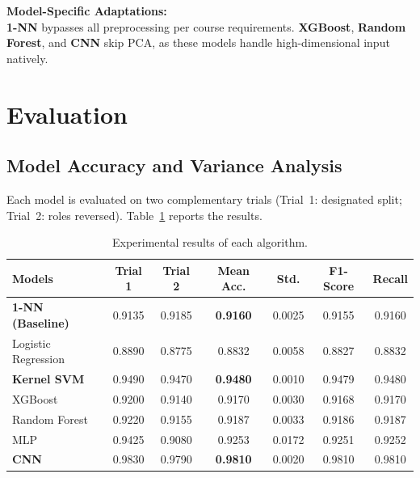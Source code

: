 \documentclass[11pt,a4paper]{article}
\begin{document}
\noindent \textbf{Model-Specific Adaptations:} \\
\textbf{1-NN} bypasses all preprocessing per course requirements. \textbf{XGBoost}, \textbf{Random Forest}, and \textbf{CNN} skip PCA, as these models handle high-dimensional input natively.

\section{Evaluation}

\subsection{Model Accuracy and Variance Analysis}
Each model is evaluated on two complementary trials (Trial~1: designated split; Trial~2: roles reversed). Table~\ref{tab:final_results} reports the results.

\begin{table}[H]
    \centering
    \renewcommand{\arraystretch}{1.3} %
    \small
    \begin{tabular}{lcccccc}
        \toprule
        \textbf{Models} & \textbf{Trial 1} & \textbf{Trial 2} & \textbf{Mean Acc.} & \textbf{Std.} & \textbf{F1-Score} & \textbf{Recall} \\
        \midrule
        \textbf{1-NN (Baseline)} & 0.9135 & 0.9185 & \textbf{0.9160} & 0.0025 & 0.9155 & 0.9160 \\
        \midrule
        Logistic Regression & 0.8890 & 0.8775 & 0.8832 & 0.0058 & 0.8827 & 0.8832 \\
        \textbf{Kernel SVM} & 0.9490 & 0.9470 & \textbf{0.9480} & 0.0010 & 0.9479 & 0.9480 \\
        XGBoost & 0.9200 & 0.9140 & 0.9170 & 0.0030 & 0.9168 & 0.9170 \\
        Random Forest & 0.9220 & 0.9155 & 0.9187 & 0.0033 & 0.9186 & 0.9187 \\
        MLP & 0.9425 & 0.9080 & 0.9253 & 0.0172 & 0.9251 & 0.9252 \\
        \textbf{CNN} & 0.9830 & 0.9790 & \textbf{0.9810} & 0.0020 & 0.9810 & 0.9810 \\
        \bottomrule
    \end{tabular}
    \caption{Experimental results of each algorithm.}
    \label{tab:final_results}
\end{table}
\end{document}
